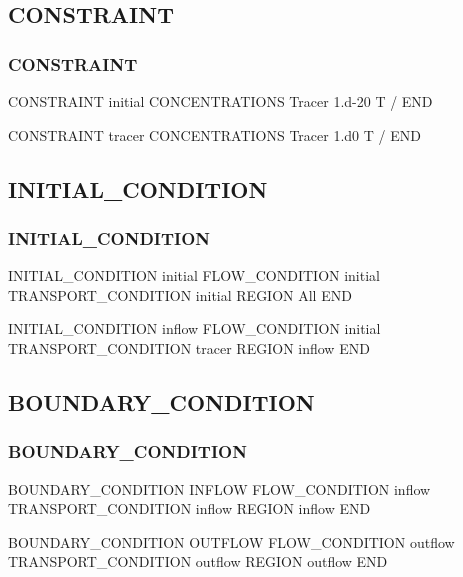 \documentclass{beamer}
\begin{document}

\subsection{CONSTRAINT}
\begin{frame}\frametitle{CONSTRAINT}
	
	\begin{semiverbatim}
CONSTRAINT initial
  CONCENTRATIONS
    Tracer 1.d-20 T
  /
END

CONSTRAINT tracer
  CONCENTRATIONS
    Tracer 1.d0 T
  /
END
	\end{semiverbatim}
\end{frame}


\subsection{INITIAL\_CONDITION}
\begin{frame}\frametitle{INITIAL\_CONDITION}
	
	\begin{semiverbatim}
INITIAL_CONDITION initial
  FLOW_CONDITION initial
  TRANSPORT_CONDITION initial
  REGION All
END

INITIAL_CONDITION inflow
  FLOW_CONDITION initial
  TRANSPORT_CONDITION tracer
  REGION inflow
END
	\end{semiverbatim}
	
\end{frame}


\subsection{BOUNDARY\_CONDITION}
\begin{frame}\frametitle{BOUNDARY\_CONDITION}
	
	\begin{semiverbatim}
BOUNDARY_CONDITION INFLOW
  FLOW_CONDITION inflow
  TRANSPORT_CONDITION inflow
  REGION inflow
END

BOUNDARY_CONDITION OUTFLOW
  FLOW_CONDITION outflow
  TRANSPORT_CONDITION outflow
  REGION outflow
END
	\end{semiverbatim}
	
\end{frame}
\end{document}
